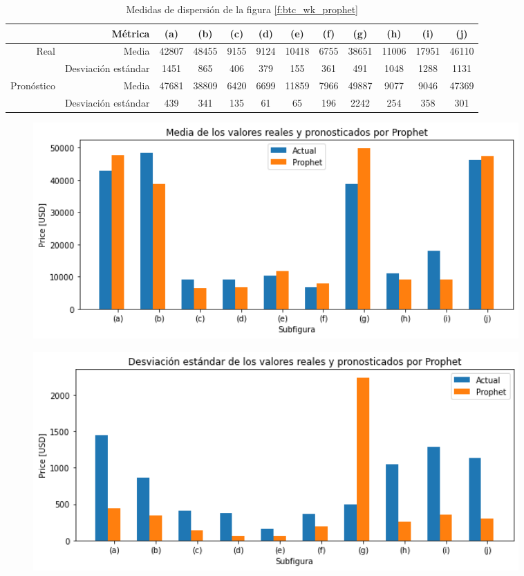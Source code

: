 \documentclass[a4paper,10pt]{article}
\begin{document}
\begin{table}[H]
 \begin{center}
 \resizebox{12cm}{!} {
  \begin{tabular}{|r|r|c|c|c|c|c|c|c|c|c|c|}
    & Métrica & (a) & (b) & (c) & (d) & (e) & (f) & (g) & (h) & (i) & (j) \\ \hline
    Real & Media & 42807 & 48455 & 9155 & 9124 & 10418 & 6755 & 38651 & 11006 & 17951 & 46110 \\
    & Desviación estándar & 1451 & 865 & 406 & 379 & 155 & 361 & 491 & 1048 & 1288 & 1131 \\
    Pronóstico & Media & 47681 & 38809 & 6420 & 6699 & 11859 & 7966 & 49887 & 9077 & 9046 & 47369 \\
    & Desviación estándar & 439 & 341 & 135 & 61 & 65 & 196 & 2242 & 254 & 358 & 301 \\ \hline
  \end{tabular}
  }
  \caption{Medidas de dispersión de la figura \ref{f:btc_wk_prophet}}
  \label{tab:btc_wk_avestd_p}
 \end{center}
\end{table}

\begin{figure}[H]
\centering
\includegraphics[width=0.9\textwidth]{./plots/prophet/btc/week/ave}
\label{f:btc_ave_wk_p}
\end{figure}


\begin{figure}[H]
\centering
\includegraphics[width=0.9\textwidth]{./plots/prophet/btc/week/std}
\label{f:btc_std_wk_p}
\end{figure}
\end{document}
